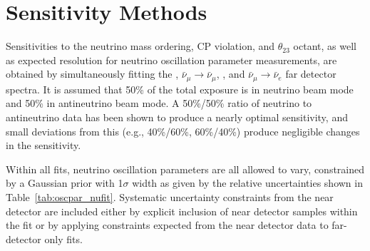 \section{Sensitivity Methods}
\label{sec:physics-lbnosc-sens}




Sensitivities to the neutrino mass ordering, CP violation, and $\theta_{23}$ octant, as well as expected resolution for neutrino oscillation parameter measurements, are obtained by simultaneously fitting the \numutonumu, $\bar{\nu}_\mu \rightarrow \bar{\nu}_\mu$, \numutonue, and $\bar{\nu}_\mu \rightarrow \bar{\nu}_e$ far detector spectra.  It is assumed that 50\% of the total exposure is in neutrino beam mode and 50\% in antineutrino beam mode.  A 50\%/50\% ratio of neutrino to antineutrino data has been shown to produce a nearly optimal sensitivity, and small deviations from this (e.g., 40\%/60\%, 60\%/40\%) produce negligible changes in the sensitivity.  

Within all fits, neutrino oscillation parameters are all allowed to vary, constrained by a Gaussian prior with 1$\sigma$ width as given by the relative uncertainties shown in Table~\ref{tab:oscpar_nufit}. Systematic uncertainty constraints from the near detector are included either by explicit inclusion of near detector samples within the fit or by applying constraints expected from the near detector data to far-detector only fits.

